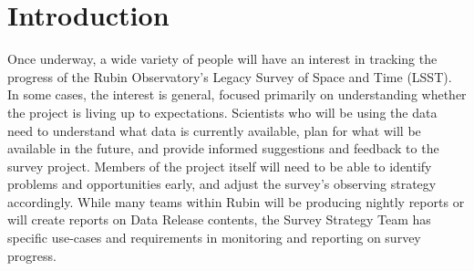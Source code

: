 
\section{Introduction}
\label{sec:orga1f344c}

Once underway, a wide variety of people will have an interest in tracking the progress of the Rubin Observatory's Legacy Survey of Space and Time (LSST).
In some cases, the interest is general, focused primarily on understanding whether the project is living up to expectations.
Scientists who will be using the data need to understand what data is currently available, plan for what will be available in the future, and provide informed suggestions and feedback to the survey project. 
Members of the project itself will need to be able to identify problems and opportunities early, and adjust the survey's observing strategy accordingly.
While many teams within Rubin will be producing nightly reports or will create reports on Data Release contents, the 
Survey Strategy Team has specific use-cases and requirements in monitoring and reporting on survey progress. 

